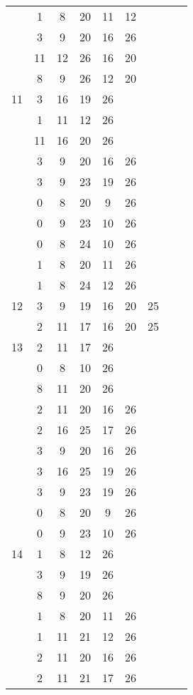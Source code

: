 \begin{table}[H]
\begin{tabular}{|c|cccccccc|}
 & 1 & 8 & 20 & 11 & 12 &   &   &  \\
 & 3 & 9 & 20 & 16 & 26 &   &   &  \\
 & 11 & 12 & 26 & 16 & 20 &   &   &  \\
 & 8 & 9 & 26 & 12 & 20 &   &   &  \\
\hline
11  & 3 & 16 & 19 & 26 &   &   &   &  \\
 & 1 & 11 & 12 & 26 &   &   &   &  \\
 & 11 & 16 & 20 & 26 &   &   &   &  \\
 & 3 & 9 & 20 & 16 & 26 &   &   &  \\
 & 3 & 9 & 23 & 19 & 26 &   &   &  \\
 & 0 & 8 & 20 & 9 & 26 &   &   &  \\
 & 0 & 9 & 23 & 10 & 26 &   &   &  \\
 & 0 & 8 & 24 & 10 & 26 &   &   &  \\
 & 1 & 8 & 20 & 11 & 26 &   &   &  \\
 & 1 & 8 & 24 & 12 & 26 &   &   &  \\
\hline
12  & 3 & 9 & 19 & 16 & 20 & 25 &   &  \\
 & 2 & 11 & 17 & 16 & 20 & 25 &   &  \\
\hline
13  & 2 & 11 & 17 & 26 &   &   &   &  \\
 & 0 & 8 & 10 & 26 &   &   &   &  \\
 & 8 & 11 & 20 & 26 &   &   &   &  \\
 & 2 & 11 & 20 & 16 & 26 &   &   &  \\
 & 2 & 16 & 25 & 17 & 26 &   &   &  \\
 & 3 & 9 & 20 & 16 & 26 &   &   &  \\
 & 3 & 16 & 25 & 19 & 26 &   &   &  \\
 & 3 & 9 & 23 & 19 & 26 &   &   &  \\
 & 0 & 8 & 20 & 9 & 26 &   &   &  \\
 & 0 & 9 & 23 & 10 & 26 &   &   &  \\
\hline
14  & 1 & 8 & 12 & 26 &   &   &   &  \\
 & 3 & 9 & 19 & 26 &   &   &   &  \\
 & 8 & 9 & 20 & 26 &   &   &   &  \\
 & 1 & 8 & 20 & 11 & 26 &   &   &  \\
 & 1 & 11 & 21 & 12 & 26 &   &   &  \\
 & 2 & 11 & 20 & 16 & 26 &   &   &  \\
 & 2 & 11 & 21 & 17 & 26 &   &   &  \\

\end{tabular}
\end{table}
